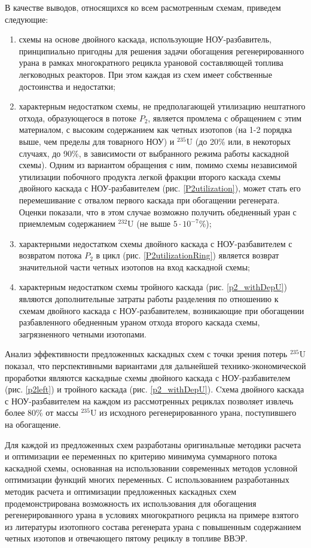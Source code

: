 В качестве выводов, относящихся ко всем расмотренным схемам, приведем следующие:
\begin{enumerate}
    \item схемы на основе двойного каскада, использующие НОУ-разбавитель, принципиально пригодны для решения задачи обогащения регенерированного урана в рамках многократного рецикла урановой составляющей топлива легководных реакторов. При этом каждая из схем имеет собственные достоинства и недостатки;
    \item характерным недостатком схемы, не предполагающей утилизацию нештатного отхода, образующегося в потоке $P_2$, является промлема с обращением с этим материалом, с высоким содержанием как четных изотопов (на 1-2 порядка выше, чем пределы для товарного НОУ) и $^{235}$U (до 20\% или, в некоторых случаях, до 90\%, в зависимости от выбранного режима работы каскадной схемы). Одним из вариантом обращения с ним, помимо схемы независимой утилизации побочного продукта легкой фракции второго каскада схемы двойного каскада с НОУ-разбавителем (рис. \ref{P2utilization}), может стать его перемешивание с отвалом первого каскада при обогащении регенерата. Оценки показали, что в этом случае возможно получить обедненный уран с приемлемым содержанием $^{232}$U (не выше $5\cdot10^{-7}$\%);
    \item характерными недостатком схемы двойного каскада с НОУ-разбавителем с возвратом потока $P_2$ в цикл (рис. \ref{P2utilizationRing}) является возврат значительной части четных изотопов на вход каскадной схемы;
    \item характерным недостатком схемы тройного каскада (рис. \ref{p2_withDepU}) являются дополнительные затраты работы разделения по отношению к схемам двойного каскада с НОУ-разбавителем, возникающие при обогащении разбавленного обедненным ураном отхода второго каскада схемы, загрязненного четными изотопами.
  \end{enumerate}

Анализ эффективности предложенных каскадных схем с точки зрения потерь $^{235}$U показал, что перспективными вариантами для дальнейшей технико-экономической проработки являются каскадные схемы двойного каскада с НОУ-разбавителем (рис. \ref{p2left}) и тройного каскада (рис. \ref{p2_withDepU}). Cхема двойного каскада с НОУ-разбавителем на каждом из рассмотренных рециклах позволяет извлечь более 80\% от массы $^{235}$U из исходного регенерированного урана, поступившего на обогащение.

Для каждой из предложенных схем разработаны оригинальные методики расчета и оптимизации ее переменных по критерию минимума суммарного потока каскадной схемы, основанная на использовании современных методов условной оптимизации функций многих переменных. С использованием разработанных методик расчета и оптимизации предложенных каскадных схем продемонстрирована возможность их использования для обогащения регенерированного урана в условиях многократного рецикла на примере взятого из литературы изотопного состава регенерата урана с повышенным содержанием четных изотопов и отвечающего пятому рециклу в топливе ВВЭР.


